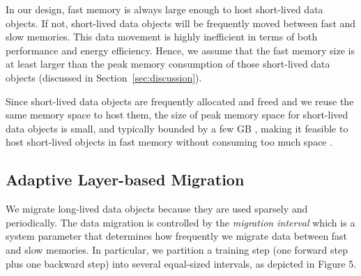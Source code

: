 In our design, fast memory is always large enough to host short-lived data objects. If not, short-lived data objects will be frequently moved between fast and slow memories. This data movement is highly inefficient in terms of both performance and energy efficiency. %
Hence, we assume that the fast memory size is at least larger than the peak memory consumption of those short-lived data objects (discussed in Section~\ref{sec:discussion}). 

Since short-lived data objects are frequently allocated and freed and we reuse the same memory space to host them, the size of peak memory space for short-lived data objects is small, and typically bounded by a few GB
\textcolor{dong2}{, making it feasible to host short-lived objects in fast memory without consuming too much space}
. 

\vspace{-5pt}
\subsection{\textcolor{dong2}{Adaptive Layer-based Migration}}
\label{sec:adaptive_dm}


We migrate long-lived data objects 
\textcolor{dong2}{because they are used sparsely and periodically}. %
The data migration is controlled by the \textit{migration interval} \textcolor{dong2}{which is a system parameter that} determines how frequently we migrate data between fast and slow memories. %
\textcolor{dong2}{In particular, we partition a training step (one forward step plus one backward step) into several equal-sized intervals, as depicted in Figure 5.}

